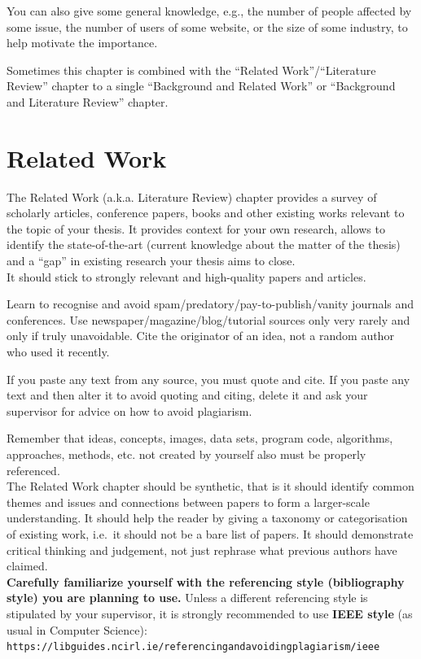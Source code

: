 \documentclass[a4paper,12pt]{Classes/RoboticsLaTeX}
\begin{document}
	You can also give some general knowledge, e.g., the number of people affected by some issue, the number of users of some website, or the size of some industry, to help motivate the importance.
	
	Sometimes this chapter is combined with the ``Related Work''/``Literature Review'' chapter to a single ``Background and Related Work'' or ``Background and Literature Review'' chapter.
	
	\chapter{Related Work}
	\label{chap:rel_work}
	
	The Related Work (a.k.a. Literature Review) chapter provides a survey of scholarly articles, conference papers, books and other existing works relevant to the topic of your thesis. It provides context for your own research, allows to identify the state-of-the-art (current knowledge about the matter of the thesis) and a ``gap'' in existing research your thesis aims to close.\\
	
	It should stick to strongly relevant and high-quality papers and articles. 
	
	Learn to recognise and avoid spam/predatory/pay-to-publish/vanity journals and conferences. Use newspaper/magazine/blog/tutorial sources only very rarely and only if truly unavoidable. Cite the originator of an idea, not a random author who used it recently.
	
	If you paste any text from any source, you must quote and cite. If you paste any text and then alter it to avoid quoting and citing, delete it and ask your supervisor for advice on how to avoid plagiarism.
	
	Remember that ideas, concepts, images, data sets, program code, algorithms, approaches, methods, etc. not created by yourself also must be properly referenced. \\
	
	The Related Work chapter should be synthetic, that is it should identify common themes and issues and connections between papers to form a larger-scale understanding. It should help the reader by giving a taxonomy or categorisation of existing work, i.e.~it should not be a bare list of papers. It should demonstrate critical thinking and judgement, not just rephrase what previous authors have claimed. \\
	
	
	\textbf{Carefully familiarize yourself with the referencing style (bibliography style) you are planning to use.} Unless a different referencing style is stipulated by your supervisor, it is strongly recommended to use \textbf{IEEE style} (as usual in Computer Science):\\ \verb#https://libguides.ncirl.ie/referencingandavoidingplagiarism/ieee#\\
	
\end{document}
